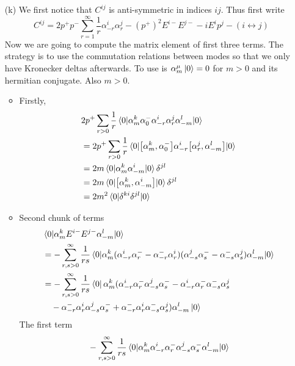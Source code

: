 \begin{enumerate}[label=(\alph*)]
	\item[(k)] We first notice that $C^{ij}$ is anti-symmetric in indices $ij$. Thus first write
		\begin{equation*}
			C^{ij} = 2 p^+ p^- \sum_{r=1}^{\infty} \frac{1}{r} \alpha^i_{-r} \alpha^j_r - (p^+)^2 E^{i-} E^{j-} - i E^i p^j - (i\leftrightarrow j)
		\end{equation*}
		Now we are going to compute the matrix element of first three terms. The strategy is to use the commutation relations between modes so that we only have Kronecker deltas afterwards. To use is $\alpha^\mu_m \ket{0} = 0$ for $m>0$ and its hermitian conjugate. Also $m>0$.
		\begin{itemize}
			\item Firstly,
				\begin{align*}
					& 2p^+ \sum_{r>0} \frac{1}{r} \braket{0 | \alpha^k_m \alpha^-_0 \alpha^i_{-r} \alpha^j_r \alpha^l_{-m} | 0} \\
					&= 2p^+ \sum_{r>0} \frac{1}{r} \braket{0 | \comm{\alpha^k_m}{\alpha^-_0} \alpha^i_{-r} \comm{\alpha^j_r}{\alpha^l_{-m}} | 0} \\
					&= 2m \braket{0 | \alpha^k_{m} \alpha^i_{-m} | 0} \delta^{jl} \\
					&= 2m \braket{0 | \comm{\alpha^k_{m}}{\alpha^i_{-m}} | 0} \delta^{jl} \\
					&= 2m^2 \braket{0 | \delta^{ki}  \delta^{jl}| 0} 
				\end{align*}
			\item Second chunk of terms
				\begin{align*}
					 & \braket{0 | \alpha^k_m E^{i-} E^{j-} \alpha^l_{-m} | 0} \\
					 &= - \sum_{r,s>0}^{\infty} \frac{1}{rs}  \braket{0 | \alpha^k_m (\alpha^i_{-r} \alpha^-_r - \alpha^-_{-r} \alpha^i_r) (\alpha^j_{-s} \alpha^-_s - \alpha^-_{-s} \alpha^{j}_s) \alpha^l_{-m} | 0} \\
																							  &= - \sum_{r,s>0}^{\infty} \frac{1}{rs} \bra{0} \alpha^k_m (\alpha^i_{-r} \alpha^-_r \alpha^j_{-s} \alpha^-_s - \alpha^i_{-r} \alpha^-_r \alpha^-_{-s} \alpha^j_s \\
																							  &\quad - \alpha^-_{-r} \alpha^i_r \alpha^j_{-s} \alpha^-_{s} + \alpha^-_{-r} \alpha^i_r \alpha^-_{-s} \alpha^j_s) \alpha^l_{-m} \ket{0}
					\end{align*}
					The first term
					\begin{align*}
																							  &  -\sum_{r,s>0}^{\infty} \frac{1}{rs}  \braket{0 | \alpha^k_m\alpha^i_{-r} \alpha^-_r \alpha^j_{-s} \alpha^-_s \alpha^l_{-m} | 0} \\

\end{align*}
\end{itemize}
\end{enumerate}
